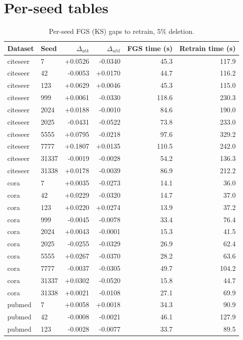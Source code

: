 \documentclass[pdflatex,sn-basic,Numbered]{sn-jnl}
\begin{document}
\appendix
\section{Per-seed tables}
\begin{table}[htbp]\centering\scriptsize
\caption{Per-seed FGS (KS) gaps to retrain, 5\% deletion.}
\begin{tabular}{llrrrr}\toprule Dataset & Seed & $\Delta_{atk}$ & $\Delta_{util}$ & FGS time (s) & Retrain time (s)\\\midrule
citeseer & 7 & +0.0526 & -0.0340 & 45.3 & 117.9\\
citeseer & 42 & -0.0053 & +0.0170 & 44.7 & 116.2\\
citeseer & 123 & +0.0629 & +0.0046 & 45.3 & 115.0\\
citeseer & 999 & +0.0061 & -0.0330 & 118.6 & 230.3\\
citeseer & 2024 & +0.0188 & -0.0010 & 84.6 & 190.0\\
citeseer & 2025 & -0.0431 & -0.0522 & 73.8 & 233.0\\
citeseer & 5555 & +0.0795 & -0.0218 & 97.6 & 329.2\\
citeseer & 7777 & +0.1807 & +0.0135 & 110.5 & 242.0\\
citeseer & 31337 & -0.0019 & -0.0028 & 54.2 & 136.3\\
citeseer & 31338 & +0.0178 & -0.0039 & 86.9 & 212.2\\
cora & 7 & +0.0035 & -0.0273 & 14.1 & 36.0\\
cora & 42 & +0.0229 & -0.0320 & 14.7 & 37.0\\
cora & 123 & +0.0220 & +0.0274 & 13.9 & 37.2\\
cora & 999 & -0.0045 & -0.0078 & 33.4 & 76.4\\
cora & 2024 & +0.0043 & -0.0001 & 15.3 & 41.5\\
cora & 2025 & -0.0255 & -0.0329 & 26.9 & 62.4\\
cora & 5555 & +0.0267 & -0.0370 & 28.2 & 63.6\\
cora & 7777 & -0.0037 & -0.0305 & 49.7 & 104.2\\
cora & 31337 & +0.0302 & -0.0520 & 15.8 & 44.7\\
cora & 31338 & +0.0021 & -0.0108 & 27.1 & 69.9\\
pubmed & 7 & +0.0058 & +0.0018 & 34.3 & 90.9\\
pubmed & 42 & -0.0008 & -0.0021 & 46.1 & 127.9\\
pubmed & 123 & -0.0028 & -0.0077 & 33.7 & 89.5\\

\end{tabular}
\end{table}
\end{document}
